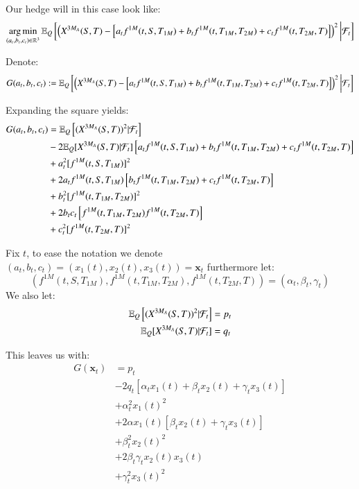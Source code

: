 Our hedge will in this case look like: 
\begin{align*}
\operatorname*{arg\,min}\limits_{(a_{t}, b_{t}, c_{t})\in \mathbb{R}^{3}}\mathbb{E}_{Q}\left[
\left(
X^{3M_{A}}(S,T)- \left[
a_{t}f^{1M}(t,S,T_{1M}) + 
b_{t}f^{1M}(t,T_{1M}, T_{2M}) + 
c_{t}f^{1M}(t,T_{2M}, T)
\right]
\right)^{2}
\bigg{|}\mathcal{F}_{t}
\right]
\end{align*}

Denote: 
\begin{align*}
G(a_{t}, b_{t}, c_{t}) := 
\mathbb{E}_{Q}\left[
\left(
X^{3M_{A}}(S,T)- \left[
a_{t}f^{1M}(t,S,T_{1M}) + 
b_{t}f^{1M}(t,T_{1M}, T_{2M}) + 
c_{t}f^{1M}(t,T_{2M}, T)
\right]
\right)^{2}
\bigg{|}\mathcal{F}_{t}
\right]
\end{align*} 

Expanding the square yields: 
\begin{align*}
G(a_{t}, b_{t}, c_{t}) 
&= 
\mathbb{E}_{Q}\left[(X^{3M_{A}}(S,T))^{2}|\mathcal{F}_{t} \right] \\
&-2\mathbb{E}_{Q}[X^{3M_{A}}(S,T)|\mathcal{F}_{t}]\left[
a_{t}f^{1M}(t,S,T_{1M}) + 
b_{t}f^{1M}(t,T_{1M}, T_{2M}) + 
c_{t}f^{1M}(t,T_{2M}, T)
\right] \\ 
&+ a_{t}^{2}[f^{1M}(t,S,T_{1M})]^{2} \\ 
&+ 2a_{t}f^{1M}(t,S,T_{1M})\left[
b_{t}f^{1M}(t,T_{1M}, T_{2M}) + 
c_{t}f^{1M}(t,T_{2M}, T)
\right] \\ 
&+ b_{t}^{2}[f^{1M}(t,T_{1M}, T_{2M})]^{2} \\ 
&+ 2b_{t}c_{t}\left[
f^{1M}(t,T_{1M}, T_{2M})f^{1M}(t,T_{2M}, T)
\right] \\ 
&+ c_{t}^{2}[f^{1M}(t,T_{2M}, T)]^{2}
\end{align*} 

Fix $t$, to ease the notation we denote $(a_{t}, b_{t}, c_{t}) = (x_{1}(t), x_{2}(t), x_{3}(t)) = \mathbf{x}_{t}$ furthermore let: 
\[
\left(
f^{1M}(t,S,T_{1M}),f^{1M}(t,T_{1M}, T_{2M}), f^{1M}(t,T_{2M}, T) 
\right)
= \left(
\alpha_{t}, \beta_{t}, \gamma_{t}
\right)
\]
We also let: 
\begin{align*}
\mathbb{E}_{Q}\left[(X^{3M_{A}}(S,T))^{2}|\mathcal{F}_{t} \right] &= p_{t} \\ 
\mathbb{E}_{Q}[X^{3M_{A}}(S,T)|\mathcal{F}_{t}] &= q_{t}
\end{align*}

This leaves us with: 
\begin{align*}
G(\mathbf{x}_{t}) &= 
p_{t} \\
&- 2q_{t}\left[
\alpha_{t} x_{1}(t) + \beta_{t} x_{2}(t) + \gamma_{t} x_{3}(t)
\right] \\ 
&+ \alpha_{t}^{2}x_{1}(t)^{2} \\ 
&+ 2\alpha x_{1}(t)\left[
\beta_{t} x_{2}(t) + \gamma_{t} x_{3}(t)
\right] \\ 
&+ \beta_{t}^{2}x_{2}(t)^{2} \\ 
&+ 2\beta_{t}\gamma_{t} x_{2}(t)x_{3}(t) \\ 
&+ \gamma_{t}^{2}x_{3}(t)^{2}
\end{align*}


